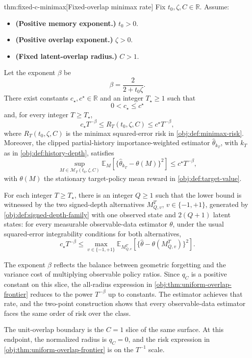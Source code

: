 \begin{theoremv}{thm:fixed-c-minimax}[Fixed-overlap minimax rate]
Fix \(t_0,\zeta,C\in\mathbb R\). Assume:
\begin{itemize}
\item \textbf{(Positive memory exponent.)} \(t_0>0\).
\item \textbf{(Positive overlap exponent.)} \(\zeta>0\).
\item \textbf{(Fixed latent-overlap radius.)} \(C>1\).
\end{itemize}
Let the exponent \(\beta\) be
\[
\beta=\frac{2}{2+t_0\zeta}.
\]
There exist constants \(c_\star,c^\star\in\mathbb R\) and an integer \(T_\star\ge 1\) such that
\[
0<c_\star\le c^\star
\]
and, for every integer \(T\ge T_\star\),
\[
c_\star T^{-\beta}
\le
R_T(t_0,\zeta,C)
\le
c^\star T^{-\beta},
\]
where \(R_T(t_0,\zeta,C)\) is the minimax squared-error risk in \cref{obj:def:minimax-risk}. Moreover, the clipped partial-history importance-weighted estimator \(\widehat\theta_{k_T}\), with \(k_T\) as in \cref{obj:def:history-depth}, satisfies
\[
\sup_{M\in\mathcal M_T(t_0,\zeta,C)}
\mathbb E_M\!\left[
\{\widehat\theta_{k_T}-\theta(M)\}^2
\right]
\le
c^\star T^{-\beta},
\]
with \(\theta(M)\) the stationary target-policy mean reward in \cref{obj:def:target-value}.

For each integer \(T\ge T_\star\), there is an integer \(Q\ge 1\) such that the lower bound is witnessed by the two signed-depth alternatives \(M_{Q,v}^T\), \(v\in\{-1,+1\}\), generated by \cref{obj:def:signed-depth-family} with one observed state and \(2(Q+1)\) latent states: for every measurable observable-data estimator \(\widehat\theta\), under the usual squared-error integrability conditions for both alternatives,
\[
c_\star T^{-\beta}
\le
\max_{v\in\{-1,+1\}}
\mathbb E_{M_{Q,v}^T}\!\left[
\{\widehat\theta-\theta(M_{Q,v}^T)\}^2
\right].
\]
\end{theoremv}

The exponent \(\beta\) reflects the balance between geometric forgetting and the variance cost of multiplying observable policy ratios. Since \(q_C\) is a positive constant on this slice, the all-radius expression in \cref{obj:thm:uniform-overlap-frontier} reduces to the power \(T^{-\beta}\) up to constants. The estimator achieves that rate, and the two-point construction shows that every observable-data estimator faces the same order of risk over the class.

The unit-overlap boundary is the \(C=1\) slice of the same surface. At this endpoint, the normalized radius is \(q_C=0\), and the risk expression in \cref{obj:thm:uniform-overlap-frontier} is on the \(T^{-1}\) scale.

